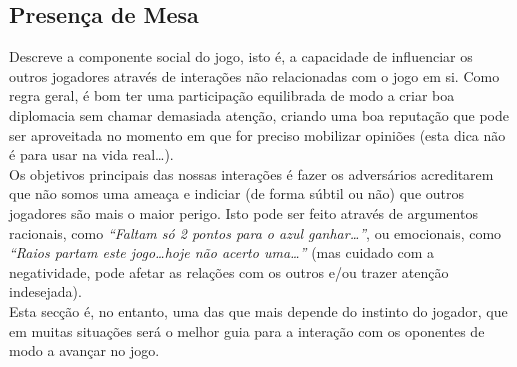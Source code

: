 \documentclass[12pt]{article}
\begin{document}
\subsection{Presença de Mesa}
Descreve a componente social do jogo, isto é, a capacidade de influenciar os outros jogadores através de interações não relacionadas com o jogo em si.
Como regra geral, é bom ter uma participação equilibrada de modo a criar boa diplomacia sem chamar demasiada atenção, criando uma boa reputação que pode ser aproveitada no momento em que for preciso mobilizar opiniões (esta dica não é para usar na vida real\dots). \\
Os objetivos principais das nossas interações é fazer os adversários acreditarem que não somos uma ameaça e indiciar (de forma súbtil ou não) que outros jogadores são mais o maior perigo.
Isto pode ser feito através de argumentos racionais, como \textit{``Faltam só 2 pontos para o azul ganhar\dots''}, ou emocionais, como \textit{``Raios partam este jogo\dots hoje não acerto uma\dots''} (mas cuidado com a negatividade, pode afetar as relações com os outros e/ou trazer atenção indesejada). \\
Esta secção é, no entanto, uma das que mais depende do instinto do jogador, que em muitas situações será o melhor guia para a interação com os oponentes de modo a avançar no jogo.
\end{document}

